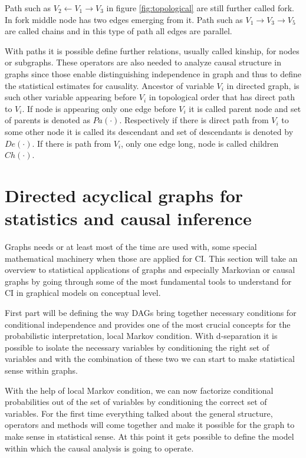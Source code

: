 \documentclass[main=english,12pt,a4paper,pdftex,econ,utf8]{aaltothesis}
\newcommand{\ch}[1]{Ch(#1)}
\newcommand{\pa}[1]{Pa(#1)}
\newcommand{\de}[1]{De(#1)}
\begin{document}
Path such as $V_{2}\leftarrow V_{1}\rightarrow V_{3}$ in figure \ref{fig:topological} are still further called fork. In fork middle node has two edges emerging from it. Path such as $V_{1}\rightarrow V_{3}\rightarrow V_{5}$ are called chains and in this type of path all edges are parallel.

With paths it is possible define further relations, usually called kinship, for nodes or subgraphs. These operators are also needed to analyze causal structure in graphs since those enable distinguishing independence in graph and thus to define the statistical estimates for causality. Ancestor of variable $V_{i}$ in directed graph, is such other variable appearing before $V_{i}$ in topological order that has direct path to $V_{i}$. If node is appearing only one edge before $V_{i}$ it is called parent node and set of parents is denoted as $\pa{\bm{\cdot}}$. Respectively if there is direct path from $V_{i}$ to some other node it is called its descendant and set of descendants is denoted by $\de{\bm{\cdot}}$. If there is path from $V_{i}$, only one edge long, node is called children $\ch{\bm{\cdot}}$.

\clearpage

\section{Directed acyclical graphs for statistics and causal inference} \label{section:stats and ci}

Graphs needs or at least most of the time are used with, some special mathematical machinery when those are applied for CI. This section will take an overview to statistical applications of graphs and especially Markovian or causal graphs by going through some of the most fundamental tools to understand for CI in graphical models on conceptual level.

First part will be defining the way DAGs bring together necessary conditions for conditional independence and provides one of the most crucial concepts for the probabilistic interpretation, local Markov condition. With d-separation it is possible to isolate the necessary variables by conditioning the right set of variables and with the combination of these two we can start to make statistical sense within graphs.

With the help of local Markov condition, we can now factorize conditional probabilities out of the set of variables by conditioning the correct set of variables. For the first time everything talked about the general structure, operators and methods will come together and make it possible for the graph to make sense in statistical sense. At this point it gets possible to define the model within which the causal analysis is going to operate.
\end{document}
